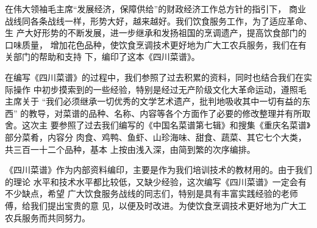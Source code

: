 \begin{center}%
\Large\bfseries%
{}%
\end{center}%

在伟大领袖毛主席{\sffamily“发展经济，保障供给”}的财政经济工作总方针的指引下，
商业战线同各条战线一样，形势大好，越来越好。我们饮食服务工作，为了适应革命、生
产大好形势的不断发展，进一步继承和发扬祖国的烹调遗产，提高饮食部门的口味质量，
增加花色品种，使饮食烹调技术更好地为广大工农兵服务，我们在有关部门的帮助和支持
下，编印了这本《四川菜谱》。

在编写《四川菜谱》的过程中，我们参照了过去积累的资料，同时也结合我们在实际操作
中初步摸索到的一些经验，特别是经过无产阶级文化大革命运动，遵照毛主席关于%
{\sffamily“我们必须继承一切优秀的文学艺术遗产，批判地吸收其中一切有益的东西”}%
的教导，对菜谱的品种、名称、内容等各个方面作了必要的修改整理并有所取舍。这次主
要参照了过去我们编写的《中国名菜谱第七辑》和搜集《重庆名菜谱》部分菜肴，内容分
肉食、鸡鸭、鱼虾、山珍海味、甜食、蔬菜、其它七个大类，共三百一十二个品种，基本
上按由浅入深，由简到繁的次序编排。

《四川菜谱》作为内部资料编印，主要是作为我们培训技术的教材用的。由于我们的理论
水平和技术水平都比较低，又缺少经验，这次编写《四川菜谱》一定会有不少缺点，希望
广大饮食服务战线的同志们，特别是具有丰富实践经验的老师傅，给我们提出宝贵的意
见，以便及时改进。为使饮食烹调技术更好地为广大工农兵服务而共同努力。

\vspace{0\baselineskip minus .800899\baselineskip}
\begin{flushright}
\end{flushright}


